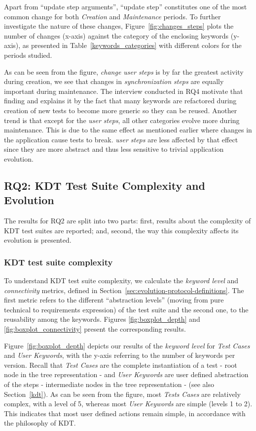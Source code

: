 Apart from ``update step arguments'', ``update step'' constitutes one of the most common change for both \emph{Creation} and \emph{Maintenance} periods. To further investigate the nature of these changes, Figure~\ref{fig:changes_steps} plots the number of changes (x-axis) against the category of the enclosing keywords (y-axis), as presented in Table~\ref{keywords_categories} with different colors for the periods studied.

As can be seen from the figure, \emph{change user steps} is by far the greatest activity during creation, we see that changes in \emph{synchronization steps} are equally important during maintenance. The interview conducted in RQ4 motivate that finding and explains it by the fact that many keywords are refactored during creation of new tests to become more generic so they can be reused. Another trend is that except for the \emph{user steps}, all other categories evolve more during maintenance. This is due to the same effect as mentioned earlier where changes in the application cause tests to break. \emph{user steps} are less affected by that effect since they are more abstract and thus less sensitive to trivial application evolution.

\subsection{RQ2: KDT Test Suite Complexity and Evolution}
\label{sec:evolution-results-rq2}

The results for RQ2 are split into two parts: first, results about the complexity of KDT test suites are reported; and, second, the way this complexity affects its evolution is presented.

\subsubsection{KDT test suite complexity}
\label{sec:kdt-test-suite}

To understand KDT test suite complexity, we calculate the \emph{keyword level} and \emph{connectivity} metrics, defined in Section~\ref{sec:evolution-protocol-definitions}. The first metric refers to the different ``abstraction levels'' (moving from pure technical to requirements expression) of the test suite and the second one, to the reusability among the keywords. Figures \ref{fig:boxplot_depth} and \ref{fig:boxplot_connectivity} present the corresponding results.

Figure~\ref{fig:boxplot_depth} depicts our results of the \emph{keyword level} for \emph{Test Cases} and \emph{User Keywords}, with the y-axis referring to the number of keywords per version. Recall that \emph{Test Cases} are the complete instantiation of a test - root node in the tree representation - and \emph{User Keywords} are user defined abstraction of the steps - intermediate nodes in the tree representation - (see also Section~\ref{kdt}). As can be seen from the figure, most \emph{Tests Cases} are relatively complex, with a level of 5, whereas most \emph{User Keywords} are simple (levels 1 to 2). This indicates that most user defined actions remain simple, in accordance with the philosophy of KDT.

